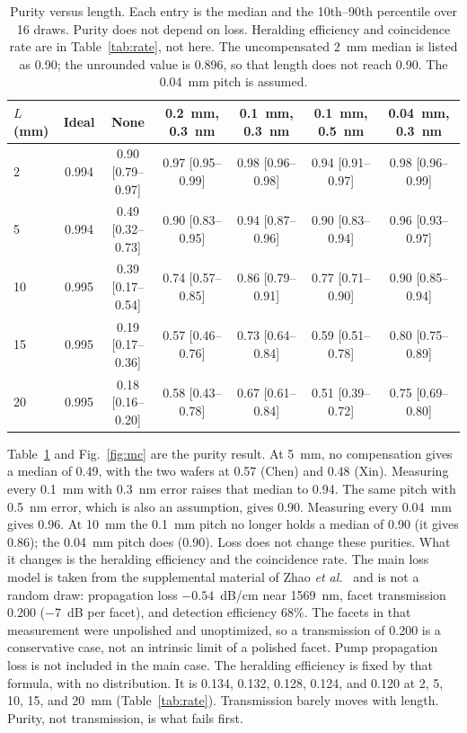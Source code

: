 \documentclass[11pt,a4paper]{article}
\begin{document}
\begin{table}[t]
\centering
\setlength{\tabcolsep}{2.2pt}
\footnotesize
\caption{Purity versus length.
Each entry is the median and the 10th--90th percentile over 16 draws.
Purity does not depend on loss.
Heralding efficiency and coincidence rate are in Table~\ref{tab:rate}, not here.
The uncompensated 2~mm median is listed as 0.90; the unrounded value is 0.896, so that length does not reach 0.90.
The 0.04~mm pitch is assumed.}
\label{tab:mc}
\small
\begin{tabular}{lcccccc}
\toprule
$L$ (mm) & Ideal & None & 0.2~mm, 0.3~nm & 0.1~mm, 0.3~nm & 0.1~mm, 0.5~nm & 0.04~mm, 0.3~nm \\
\midrule
2  & 0.994 & 0.90 [0.79--0.97] & 0.97 [0.95--0.99] & 0.98 [0.96--0.98] & 0.94 [0.91--0.97] & 0.98 [0.96--0.99] \\
5  & 0.994 & 0.49 [0.32--0.73] & 0.90 [0.83--0.95] & 0.94 [0.87--0.96] & 0.90 [0.83--0.94] & 0.96 [0.93--0.97] \\
10 & 0.995 & 0.39 [0.17--0.54] & 0.74 [0.57--0.85] & 0.86 [0.79--0.91] & 0.77 [0.71--0.90] & 0.90 [0.85--0.94] \\
15 & 0.995 & 0.19 [0.17--0.36] & 0.57 [0.46--0.76] & 0.73 [0.64--0.84] & 0.59 [0.51--0.78] & 0.80 [0.75--0.89] \\
20 & 0.995 & 0.18 [0.16--0.20] & 0.58 [0.43--0.78] & 0.67 [0.61--0.84] & 0.51 [0.39--0.72] & 0.75 [0.69--0.80] \\
\bottomrule
\end{tabular}
\end{table}

Table~\ref{tab:mc} and Fig.~\ref{fig:mc} are the purity result.
At 5~mm, no compensation gives a median of 0.49, with the two wafers at 0.57 (Chen) and 0.48 (Xin).
Measuring every 0.1~mm with 0.3~nm error raises that median to 0.94.
The same pitch with 0.5~nm error, which is also an assumption, gives 0.90.
Measuring every 0.04~mm gives 0.96.
At 10~mm the 0.1~mm pitch no longer holds a median of 0.90 (it gives 0.86); the 0.04~mm pitch does (0.90).
Loss does not change these purities.
What it changes is the heralding efficiency and the coincidence rate.
The main loss model is taken from the supplemental material of Zhao \emph{et al.}\ \cite{Zhao2020} and is not a random draw: propagation loss $-0.54$~dB/cm near 1569~nm, facet transmission 0.200 ($-7$~dB per facet), and detection efficiency 68\%.
The facets in that measurement were unpolished and unoptimized, so a transmission of 0.200 is a conservative case, not an intrinsic limit of a polished facet.
Pump propagation loss is not included in the main case.
The heralding efficiency is fixed by that formula, with no distribution.
It is 0.134, 0.132, 0.128, 0.124, and 0.120 at 2, 5, 10, 15, and 20~mm (Table~\ref{tab:rate}).
Transmission barely moves with length.
Purity, not transmission, is what fails first.
\end{document}
